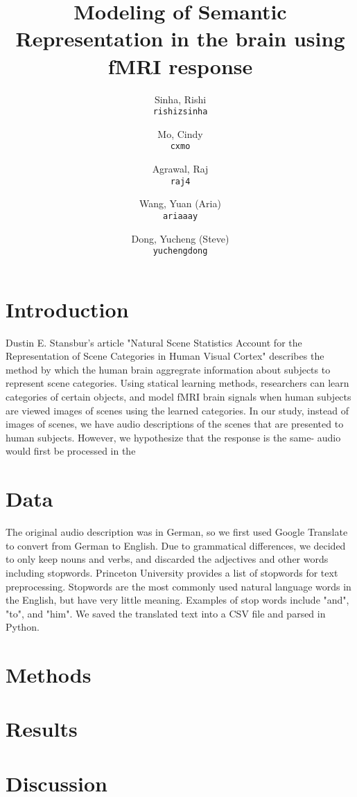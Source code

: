 \documentclass[11pt]{article}
\title{Modeling of Semantic Representation in the brain using fMRI response}
\author{
  Sinha, Rishi\\
  \texttt{rishizsinha}
  \and
  Mo, Cindy\\
  \texttt{cxmo}
  \and
  Agrawal, Raj\\
  \texttt{raj4}
  \and
  Wang, Yuan (Aria)\\
  \texttt{ariaaay}
  \and
  Dong, Yucheng (Steve)\\
  \texttt{yuchengdong}
}
\begin{document}
\maketitle



\section{Introduction}
Dustin E. Stansbur's article "Natural Scene Statistics Account for the Representation of 
Scene Categories in Human Visual Cortex" describes the method by which the human brain 
aggregrate information about subjects to represent scene categories. Using statical learning 
methods, researchers can learn categories of certain objects, and model fMRI brain signals 
when human subjects are viewed images of scenes using the learned categories. In our study, 
instead of images of scenes, we have audio descriptions of the scenes that are presented to 
human subjects. However, we hypothesize that the response is the same- audio would first be 
processed in the  

\section{Data}
 The original audio description was in German, so we first used Google Translate 
 to convert from German to English. Due to grammatical differences, we decided to
 only keep nouns and verbs, and discarded the adjectives and other words including
 stopwords. Princeton University provides a list of stopwords for text preprocessing.
 Stopwords are the most commonly used natural language words in the English, but have 
 very little meaning. Examples of stop words include "and", "to", and "him". We saved 
 the translated text into a CSV file and parsed in Python. 

\section{Methods}
\section{Results}
\section{Discussion}



\end{document}
